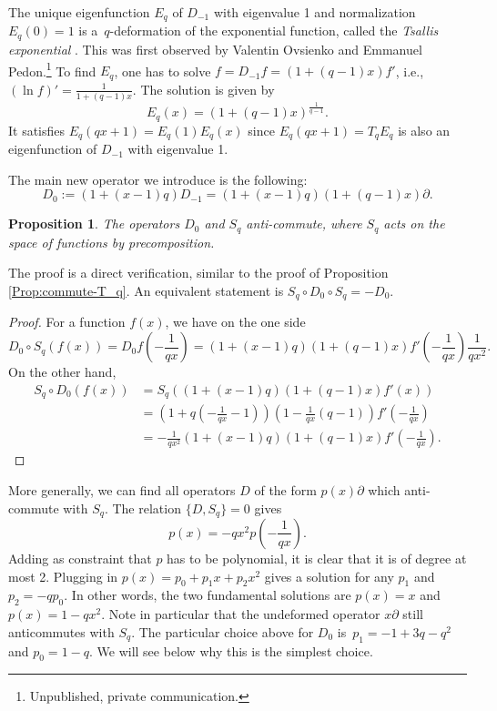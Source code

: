 \documentclass[pdftex]{sigma}
\numberwithin{equation}{section}
\newtheorem{Proposition}[Theorem]{Proposition}
 { \theoremstyle{definition}
\newtheorem{Definition}[Theorem]{Definition}
\newtheorem{Note}[Theorem]{Note}
\newtheorem{Example}[Theorem]{Example}
\newtheorem{Remark}[Theorem]{Remark} }
\begin{document}
The unique eigenfunction $E_q$ of $D_{-1}$ with eigenvalue 1 and normalization $E_q(0)=1$ is a~$q$-deformation of the exponential function, called the \emph{Tsallis exponential} \cite{tsallis1988possible}. This was first observed by Valentin Ovsienko and Emmanuel Pedon.\footnote{Unpublished, private communication.} To find $E_q$, one has to solve ${f=D_{-1}f=(1+(q-1)x)f'}$, i.e., $(\ln f)'=\frac{1}{1+(q-1)x}$. The solution is given by
\[
E_q(x)=(1+(q-1)x)^{\frac{1}{q-1}}.
\]
It satisfies $E_q(qx+1)=E_q(1)E_q(x)$ since $E_q(qx+1)=T_qE_q$ is also an eigenfunction of $D_{-1}$ with eigenvalue 1.


The main new operator we introduce is the following:
\[%
D_0:=(1+(x-1)q)D_{-1}=(1+(x-1)q)(1+(q-1)x)\partial.
\]

\begin{Proposition}\label{Prop:commute-S_q}
The operators $D_0$ and $S_q$ anti-commute, where $S_q$ acts on the space of functions by precomposition.
\end{Proposition}
The proof is a direct verification, similar to the proof of Proposition \ref{Prop:commute-T_q}. An equivalent statement is $S_q\circ D_0\circ S_q=-D_0$.

\begin{proof} For a function $f(x)$, we have on the one side
\[
D_0\circ S_q(f(x))=D_0 f\left(-\frac{1}{qx}\right)=(1+(x-1)q)(1+(q-1)x)f'\left(-\frac{1}{qx}\right)\frac{1}{qx^2}.
\]
On the other hand,
\begin{align*}
S_q\circ D_0(f(x)) &= S_q((1+(x-1)q)(1+(q-1)x)f'(x)) \\
&= \left(1+q\left(-\frac{1}{qx}-1\right)\right)\left(1-\frac{1}{qx}(q-1)\right)f'\left(-\frac{1}{qx}\right)\\
&= -\frac{1}{qx^2}(1+(x-1)q)(1+(q-1)x)f'\left(-\frac{1}{qx}\right).\tag*{\qed}
\end{align*}\renewcommand{\qed}{}
\end{proof}

More generally, we can find all operators $D$ of the form $p(x)\partial$ which anti-commute with $S_q$. The relation $\{D,S_q\}=0$ gives
\[
p(x)=-qx^2p\left(-\frac{1}{qx}\right).
\]
Adding as constraint that $p$ has to be polynomial, it is clear that it is of degree at most 2. Plugging in $p(x)=p_0+p_1x+p_2x^2$ gives a solution for any $p_1$ and $p_2=-qp_0$. In other words, the two fundamental solutions are $p(x)=x$ and $p(x)=1-qx^2$.
Note in particular that the undeformed operator $x\partial$ still anticommutes with $S_q$.
The particular choice above for $D_0$ is~${p_1=-1+3q-q^2}$ and $p_0=1-q$. We will see below why this is the simplest choice.
\end{document}
